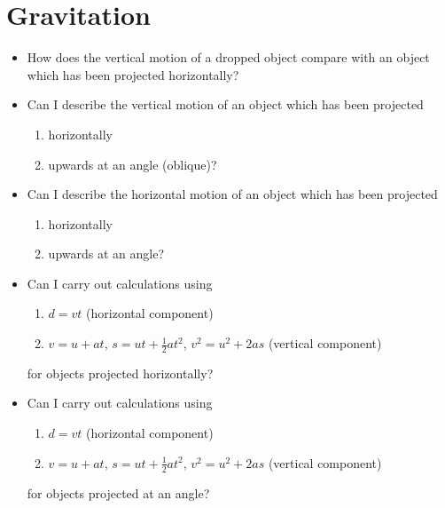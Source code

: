     \section{Gravitation}
    \begin{multicols}{2}
        \begin{itemize}
            \item How does the vertical motion of a dropped object compare
                with an object which has been projected horizontally?
                
            \item Can I describe the vertical motion of an object which has
                been projected
            \begin{enumerate}
                \item horizontally
                \item upwards at an angle (oblique)?
            \end{enumerate}

            \item Can I describe the horizontal motion of an object which has
                been projected
            \begin{enumerate}
                \item horizontally
                \item upwards at an angle?
            \end{enumerate}

            \item Can I carry out calculations using
                \begin{enumerate}
                    \item $d = vt$ (horizontal component)\\
                    \item $v = u + at$, $s = ut + \frac{1}{2}at^2$, 
                        $v^2 = u^2 + 2as$ (vertical component)
                \end{enumerate}
                for objects projected horizontally?

            \item Can I carry out calculations using
                \begin{enumerate}
                    \item $d = vt$ (horizontal component)\\
                    \item $v = u + at$, $s = ut + \frac{1}{2}at^2$, 
                        $v^2 = u^2 + 2as$ (vertical component)
                \end{enumerate}
                for objects projected at an angle?


\end{itemize}
\end{multicols}
